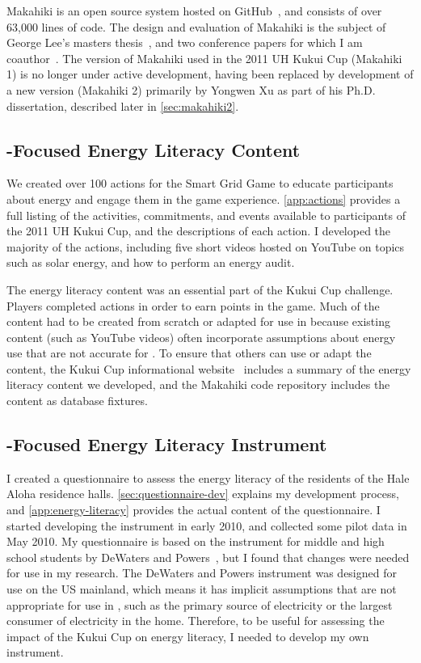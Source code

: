 Makahiki is an open source system hosted on GitHub~\cite{makahiki-site}, and consists of over 63,000 lines of code. The design and evaluation of Makahiki is the subject of George Lee's masters thesis~\cite{csdl2-11-01}, and two conference papers for which I am coauthor~\cite{csdl2-12-06,csdl2-12-12}. The version of Makahiki used in the 2011 UH Kukui Cup (Makahiki 1) is no longer under active development, having been replaced by development of a new version (Makahiki 2) primarily by Yongwen Xu as part of his Ph.D. dissertation, described later in \autoref{sec:makahiki2}.


\subsection{\Hawaii-Focused Energy Literacy Content}

We created over 100 actions for the Smart Grid Game to educate participants about energy and engage them in the game experience. \autoref{app:actions} provides a full listing of the activities, commitments, and events available to participants of the 2011 UH Kukui Cup, and the descriptions of each action. I developed the majority of the actions, including five short videos hosted on YouTube on topics such as solar energy, and how to perform an energy audit. 

The energy literacy content was an essential part of the Kukui Cup challenge. Players completed actions in order to earn points in the game. Much of the content had to be created from scratch or adapted for use in \Hawaii because existing content (such as YouTube videos) often incorporate assumptions about energy use that are not accurate for \Hawaii. To ensure that others can use or adapt the content, the Kukui Cup informational website~\cite{kukuicup-org-website} includes a summary of the energy literacy content we developed, and the Makahiki code repository includes the content as database fixtures.


\subsection{\Hawaii-Focused Energy Literacy Instrument}

I created a questionnaire to assess the energy literacy of the residents of the Hale Aloha residence halls. \autoref{sec:questionnaire-dev} explains my development process, and \autoref{app:energy-literacy} provides the actual content of the questionnaire. I started developing the instrument in early 2010, and collected some pilot data in May 2010. My questionnaire is based on the instrument for middle and high school students by DeWaters and Powers~\cite{DeWaters2011}, but I found that changes were needed for use in my research. The DeWaters and Powers instrument was designed for use on the US mainland, which means it has implicit assumptions that are not appropriate for use in \Hawaii, such as the primary source of electricity or the largest consumer of electricity in the home. Therefore, to be useful for assessing the impact of the Kukui Cup on energy literacy, I needed to develop my own instrument.

